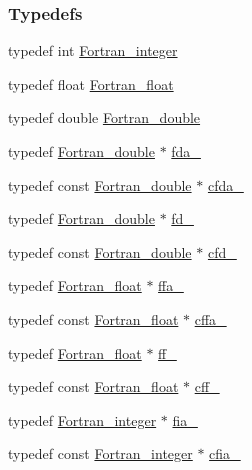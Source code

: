 \subsubsection*{Typedefs}
\begin{DoxyCompactItemize}
\item 
typedef int \hyperlink{fortran_8h_a15b7ce181271097cf077da8f76060542}{Fortran\_\-integer}
\item 
typedef float \hyperlink{fortran_8h_a46fd6cfac5ea84b62063d1a39291c40f}{Fortran\_\-float}
\item 
typedef double \hyperlink{fortran_8h_a4d76581d14d29838a4afe6fa1bf606bd}{Fortran\_\-double}
\item 
typedef \hyperlink{fortran_8h_a4d76581d14d29838a4afe6fa1bf606bd}{Fortran\_\-double} $\ast$ \hyperlink{fortran_8h_a4a18500881ce6d14fcd7eb76b43d6d93}{fda\_\-}
\item 
typedef const \hyperlink{fortran_8h_a4d76581d14d29838a4afe6fa1bf606bd}{Fortran\_\-double} $\ast$ \hyperlink{fortran_8h_abafafa136f1f176b0b12d102b049afb8}{cfda\_\-}
\item 
typedef \hyperlink{fortran_8h_a4d76581d14d29838a4afe6fa1bf606bd}{Fortran\_\-double} $\ast$ \hyperlink{fortran_8h_ad74d85d4b442b08e79d12d1eb0157872}{fd\_\-}
\item 
typedef const \hyperlink{fortran_8h_a4d76581d14d29838a4afe6fa1bf606bd}{Fortran\_\-double} $\ast$ \hyperlink{fortran_8h_afaea8dba118cca2d0d403eb74cc3d558}{cfd\_\-}
\item 
typedef \hyperlink{fortran_8h_a46fd6cfac5ea84b62063d1a39291c40f}{Fortran\_\-float} $\ast$ \hyperlink{fortran_8h_a388a9ee192080261f9fb708605a020a2}{ffa\_\-}
\item 
typedef const \hyperlink{fortran_8h_a46fd6cfac5ea84b62063d1a39291c40f}{Fortran\_\-float} $\ast$ \hyperlink{fortran_8h_ab95eaa87acbfb1ced5f381d18fba7012}{cffa\_\-}
\item 
typedef \hyperlink{fortran_8h_a46fd6cfac5ea84b62063d1a39291c40f}{Fortran\_\-float} $\ast$ \hyperlink{fortran_8h_a2cd3f526ba081495fe1fc71fcc154b75}{ff\_\-}
\item 
typedef const \hyperlink{fortran_8h_a46fd6cfac5ea84b62063d1a39291c40f}{Fortran\_\-float} $\ast$ \hyperlink{fortran_8h_a93165f45ea12ce959ec343a0d67c4a35}{cff\_\-}
\item 
typedef \hyperlink{fortran_8h_a15b7ce181271097cf077da8f76060542}{Fortran\_\-integer} $\ast$ \hyperlink{fortran_8h_a785e5772faf258eb171df131439a7597}{fia\_\-}
\item 
typedef const \hyperlink{fortran_8h_a15b7ce181271097cf077da8f76060542}{Fortran\_\-integer} $\ast$ \hyperlink{fortran_8h_a4b3ac5d91419543d1b7af1722330fe1b}{cfia\_\-}

\end{DoxyCompactItemize}
